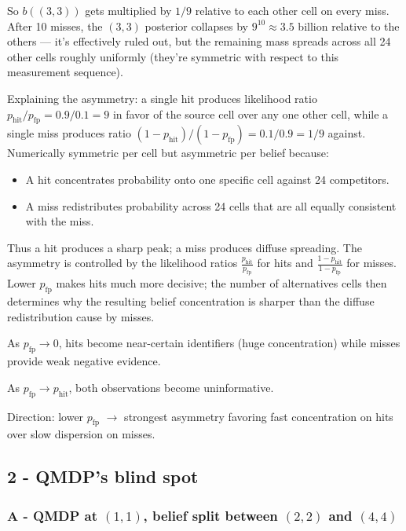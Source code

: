 \documentclass[conference]{IEEEtran}
\begin{document}
	So $b((3,3))$ gets multiplied by $1/9$ relative to each other cell on every miss. After 10 misses, the $(3,3)$ posterior collapses by $9^{10} \approx 3.5$ billion relative to the others --- it's effectively ruled out, but the remaining mass spreads across all 24 other cells roughly uniformly (they're symmetric with respect to this measurement sequence).
	
	Explaining the asymmetry: a single hit produces likelihood ratio $p_{\text{hit}}/p_{\text{fp}} = 0.9 / 0.1 = 9$ in favor of the source cell over any one other cell, while a single miss produces ratio $(1-p_{\text{hit}})/(1-p_{\text{fp}}) = 0.1/0.9 = 1/9$ against. Numerically symmetric per cell but asymmetric per belief because:
	
	\begin{itemize}
		\item A hit concentrates probability onto one specific cell against 24 competitors.
		\item A miss redistributes probability across 24 cells that are all equally consistent with the miss.
	\end{itemize}
	
	Thus a hit produces a sharp peak; a miss produces diffuse spreading. The asymmetry is controlled by the likelihood ratios 
	$\frac{p_{\text{hit}}}{p_{\text{fp}}}$ for hits and 
	$\frac{1-p_{\text{hit}}}{1-p_{\text{fp}}}$ for misses. Lower $p_{\text{fp}}$ makes hits much more decisive; the number of alternatives cells then determines why the resulting belief concentration is sharper than the diffuse redistribution cause by misses.	
	
	
	As $p_{\text{fp}} \to 0$, hits become near-certain identifiers (huge concentration) while misses provide weak negative evidence.
	
	As $p_{\text{fp}} \to p_{\text{hit}}$, both observations become uninformative. 
	
	Direction: lower $p_{\text{fp}}$ $\to$ strongest asymmetry favoring fast concentration on hits over slow dispersion on misses.
	
	\subsection{2 - QMDP’s blind spot}
	
	\subsubsection{A - QMDP at $(1,1)$, belief split between $(2,2)$ and $(4,4)$}
	
\end{document}
